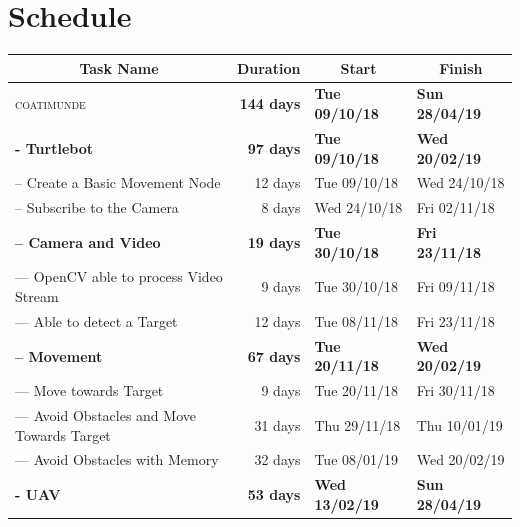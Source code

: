 \documentclass{article}
\begin{document}
\section{Schedule}

\begin{table}[H]
	\begin{tabular}{|l|r|l|l|}
		\hline
		\multicolumn{1}{|c|}{\textbf{Task Name}}            & \multicolumn{1}{c|}{\textbf{Duration}} & \multicolumn{1}{c|}{\textbf{Start}} & \multicolumn{1}{c|}{\textbf{Finish}} \\ \hline
		\textsc{coatimunde}	            		    & \textbf{144 days} & \textbf{Tue 09/10/18} & \textbf{Sun 28/04/19} \\ \hline
		\textbf{- Turtlebot}                                & \textbf{97 days}  & \textbf{Tue 09/10/18} & \textbf{Wed 20/02/19} \\ \hline
		-- Create a Basic Movement Node                     & 12 days           & Tue 09/10/18          & Wed 24/10/18          \\ \hline
		-- Subscribe to the Camera                          & 8 days            & Wed 24/10/18          & Fri 02/11/18          \\ \hline
		\textbf{-- Camera and Video}                        & \textbf{19 days}  & \textbf{Tue 30/10/18} & \textbf{Fri 23/11/18} \\ \hline
		--- OpenCV able to process Video Stream 	    & 9 days            & Tue 30/10/18          & Fri 09/11/18          \\ \hline
		--- Able to detect a Target                         & 12 days           & Tue 08/11/18          & Fri 23/11/18          \\ \hline
		\textbf{-- Movement}                                & \textbf{67 days}  & \textbf{Tue 20/11/18} & \textbf{Wed 20/02/19} \\ \hline
		--- Move towards Target                             & 9 days            & Tue 20/11/18          & Fri 30/11/18          \\ \hline
		--- Avoid Obstacles and Move Towards Target         & 31 days           & Thu 29/11/18          & Thu 10/01/19          \\ \hline
		--- Avoid Obstacles with Memory 		    & 32 days           & Tue 08/01/19          & Wed 20/02/19          \\ \hline
		\textbf{- UAV}                                      & \textbf{53 days}  & \textbf{Wed 13/02/19} & \textbf{Sun 28/04/19} \\ \hline

\end{tabular}
\end{table}
\end{document}
